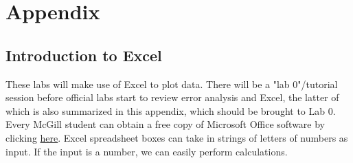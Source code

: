 \documentclass[12pt]{report}
\begin{document}
\begin{tcolorbox}

\end{tcolorbox}



\part{Appendix}
\label{Part:Appendix}
\begin{appendix}


\chapter{Introduction to Excel}
\label{App:Excel}

These labs will make use of Excel to plot data. There will be a "lab 0"/tutorial session before official labs start to review error analysis and Excel, the latter of which is also summarized in this appendix, which should be brought to Lab 0. Every McGill student can obtain a free copy of Microsoft Office software by clicking \href{http://kb.mcgill.ca/kb/article?ArticleId=5172&source=Article&c=12&cid=2}{here}. Excel spreadsheet boxes can take in strings of letters of numbers as input. If the input is a number, we can easily perform calculations.\\


\end{appendix}
\end{document}
